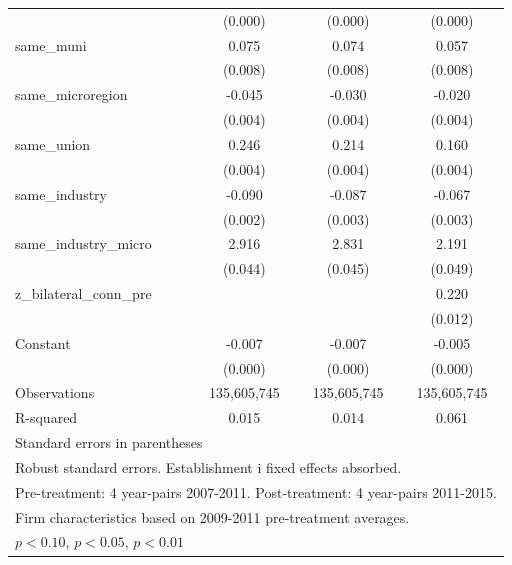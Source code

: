 \begin{table}[htbp]
\begin{tabular}{l*{3}{c}}
                    &     (0.000)         &     (0.000)         &     (0.000)         \\
\addlinespace
same\_muni           &       0.075\sym{***}&       0.074\sym{***}&       0.057\sym{***}\\
                    &     (0.008)         &     (0.008)         &     (0.008)         \\
\addlinespace
same\_microregion    &      -0.045\sym{***}&      -0.030\sym{***}&      -0.020\sym{***}\\
                    &     (0.004)         &     (0.004)         &     (0.004)         \\
\addlinespace
same\_union          &       0.246\sym{***}&       0.214\sym{***}&       0.160\sym{***}\\
                    &     (0.004)         &     (0.004)         &     (0.004)         \\
\addlinespace
same\_industry       &      -0.090\sym{***}&      -0.087\sym{***}&      -0.067\sym{***}\\
                    &     (0.002)         &     (0.003)         &     (0.003)         \\
\addlinespace
same\_industry\_micro &       2.916\sym{***}&       2.831\sym{***}&       2.191\sym{***}\\
                    &     (0.044)         &     (0.045)         &     (0.049)         \\
\addlinespace
z\_bilateral\_conn\_pre&                     &                     &       0.220\sym{***}\\
                    &                     &                     &     (0.012)         \\
\addlinespace
Constant            &      -0.007\sym{***}&      -0.007\sym{***}&      -0.005\sym{***}\\
                    &     (0.000)         &     (0.000)         &     (0.000)         \\
\midrule
Observations        & 135,605,745         & 135,605,745         & 135,605,745         \\
R-squared           &       0.015         &       0.014         &       0.061         \\
\bottomrule
\multicolumn{4}{l}{\footnotesize Standard errors in parentheses}\\
\multicolumn{4}{l}{\footnotesize Robust standard errors. Establishment i fixed effects absorbed.}\\
\multicolumn{4}{l}{\footnotesize Pre-treatment: 4 year-pairs 2007-2011. Post-treatment: 4 year-pairs 2011-2015.}\\
\multicolumn{4}{l}{\footnotesize Firm characteristics based on 2009-2011 pre-treatment averages.}\\
\multicolumn{4}{l}{\footnotesize \sym{*} \(p<0.10\), \sym{**} \(p<0.05\), \sym{***} \(p<0.01\)}\\
\end{tabular}
\end{table}

